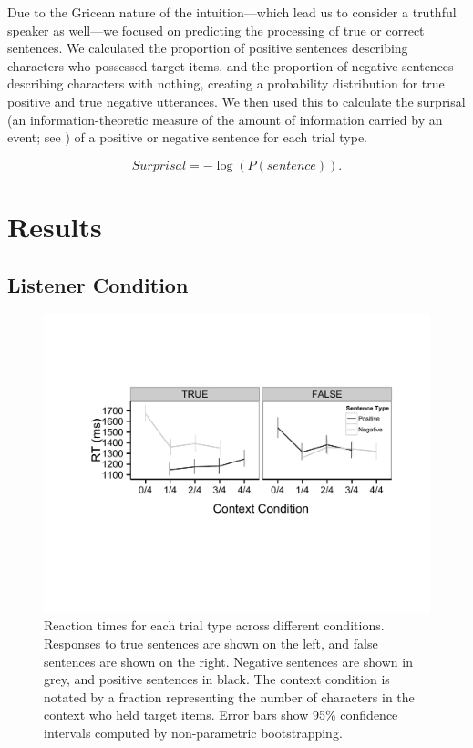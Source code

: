 \documentclass[man, noapacite]{apa2}
\begin{document}
Due to the Gricean nature of the intuition---which lead us to consider a truthful speaker as well---we focused on predicting the processing of true or correct sentences.   We calculated the proportion of positive sentences describing characters who possessed target items, and the proportion of negative sentences describing characters with nothing, creating a probability distribution for true positive and true negative utterances.  We then used this to calculate the surprisal (an information-theoretic measure of the amount of information carried by an event; see \cite{levy2008}) of a positive or negative sentence for each trial type.  

\begin{equation}\label{eq:surprise}
Surprisal = -\log(P(sentence)).
\end{equation}


\section{Results}

\subsection{Listener Condition}

\begin{figure}[t]
\begin{center} 
\includegraphics[width=4.5in]{figures/rts.pdf}
\caption{\label{fig:e2line} Reaction times for each trial type across different conditions. Responses to true sentences are shown on the left, and false sentences are shown on the right.  Negative sentences are shown in grey, and positive sentences in black.  The context condition is notated by a fraction representing the number of characters in the context who held target items. Error bars show 95\% confidence intervals computed by non-parametric bootstrapping.  }
\end{center} 
\end{figure}
\end{document}
